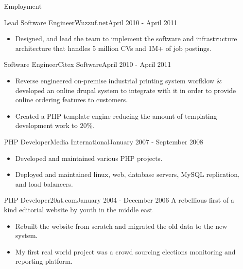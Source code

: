 \documentclass[]{mosabcv}
\begin{document}
\begin{cvsection}{Employment}
        \begin{cvsubsection}{Lead Software Engineer}{Wuzzuf.net}{April 2010 - April 2011}
            \begin{itemize}
                \item Designed, and lead the team to implement the software and infrastructure architecture that handles 5 million CVs and 1M+ of job postings.
            \end{itemize}
        \end{cvsubsection}

        \begin{cvsubsection}{Software Engineer}{Citex Software}{April 2010 - April 2011}
            \begin{itemize}
                \item Reverse engineered on-premise industrial printing system worfklow \& developed an online drupal system to integrate with it in order to provide online ordering features to customers.
                \item Created a PHP template engine reducing the amount of templating development work to 20\%.
            \end{itemize}
        \end{cvsubsection}

        \begin{cvsubsection}{PHP Developer}{Media International}{January 2007 - September 2008}
            \begin{itemize}
                \item Developed and maintained various PHP projects.
                \item Deployed and maintained linux, web, database servers, MySQL replication, and load balancers.
            \end{itemize}
        \end{cvsubsection}

        \begin{cvsubsection}{PHP Developer}{20at.com}{January 2004 - December 2006}
            A rebellious first of a kind editorial website by youth in the middle east
            \begin{itemize}
                \item Rebuilt the website from scratch and migrated the old data to the new system.
                \item My first real world project was a crowd sourcing elections monitoring and reporting platform.
            \end{itemize}
        \end{cvsubsection}

    \end{cvsection}
\end{document}
